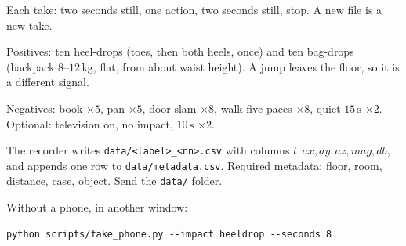 \documentclass[11pt,a4paper]{article}
\begin{document}
Each take: two seconds still, one action, two seconds still, stop. A new file is a new take.

Positives: ten heel-drops (toes, then both heels, once) and ten bag-drops (backpack \(8\)--\(12\,\mathrm{kg}\), flat, from about waist height). A jump leaves the floor, so it is a different signal.

Negatives: book \(\times 5\), pan \(\times 5\), door slam \(\times 8\), walk five paces \(\times 8\), quiet \(15\,\mathrm{s}\) \(\times 2\). Optional: television on, no impact, \(10\,\mathrm{s}\) \(\times 2\).

The recorder writes \texttt{data/<label>\_<nn>.csv} with columns \(t,ax,ay,az,mag,db\), and appends one row to \texttt{data/metadata.csv}. Required metadata: floor, room, distance, case, object. Send the \texttt{data/} folder.

Without a phone, in another window:
\begin{verbatim}
python scripts/fake_phone.py --impact heeldrop --seconds 8
\end{verbatim}
\end{document}
